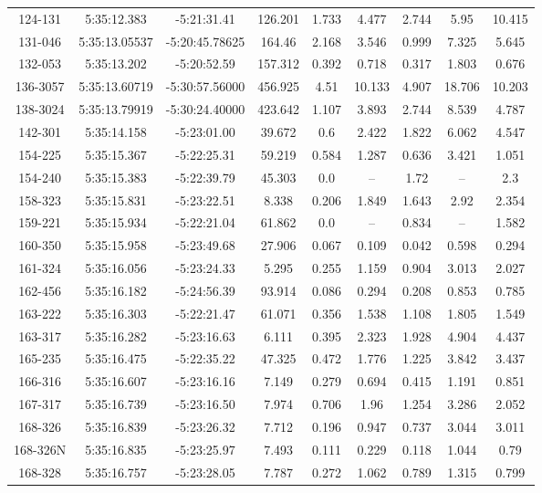 \begin{table}
\begin{tabular}{ccccccccc}
124-131 & 5:35:12.383 & -5:21:31.41 & 126.201 & 1.733 & 4.477 & 2.744 & 5.95 & 10.415 \\
131-046 & 5:35:13.05537 & -5:20:45.78625 & 164.46 & 2.168 & 3.546 & 0.999 & 7.325 & 5.645 \\
132-053 & 5:35:13.202 & -5:20:52.59 & 157.312 & 0.392 & 0.718 & 0.317 & 1.803 & 0.676 \\
136-3057 & 5:35:13.60719 & -5:30:57.56000 & 456.925 & 4.51 & 10.133 & 4.907 & 18.706 & 10.203 \\
138-3024 & 5:35:13.79919 & -5:30:24.40000 & 423.642 & 1.107 & 3.893 & 2.744 & 8.539 & 4.787 \\
142-301 & 5:35:14.158 & -5:23:01.00 & 39.672 & 0.6 & 2.422 & 1.822 & 6.062 & 4.547 \\
154-225 & 5:35:15.367 & -5:22:25.31 & 59.219 & 0.584 & 1.287 & 0.636 & 3.421 & 1.051 \\
154-240 & 5:35:15.383 & -5:22:39.79 & 45.303 & 0.0 & -- & 1.72 & -- & 2.3 \\
158-323 & 5:35:15.831 & -5:23:22.51 & 8.338 & 0.206 & 1.849 & 1.643 & 2.92 & 2.354 \\
159-221 & 5:35:15.934 & -5:22:21.04 & 61.862 & 0.0 & -- & 0.834 & -- & 1.582 \\
160-350 & 5:35:15.958 & -5:23:49.68 & 27.906 & 0.067 & 0.109 & 0.042 & 0.598 & 0.294 \\
161-324 & 5:35:16.056 & -5:23:24.33 & 5.295 & 0.255 & 1.159 & 0.904 & 3.013 & 2.027 \\
162-456 & 5:35:16.182 & -5:24:56.39 & 93.914 & 0.086 & 0.294 & 0.208 & 0.853 & 0.785 \\
163-222 & 5:35:16.303 & -5:22:21.47 & 61.071 & 0.356 & 1.538 & 1.108 & 1.805 & 1.549 \\
163-317 & 5:35:16.282 & -5:23:16.63 & 6.111 & 0.395 & 2.323 & 1.928 & 4.904 & 4.437 \\
165-235 & 5:35:16.475 & -5:22:35.22 & 47.325 & 0.472 & 1.776 & 1.225 & 3.842 & 3.437 \\
166-316 & 5:35:16.607 & -5:23:16.16 & 7.149 & 0.279 & 0.694 & 0.415 & 1.191 & 0.851 \\
167-317 & 5:35:16.739 & -5:23:16.50 & 7.974 & 0.706 & 1.96 & 1.254 & 3.286 & 2.052 \\
168-326 & 5:35:16.839 & -5:23:26.32 & 7.712 & 0.196 & 0.947 & 0.737 & 3.044 & 3.011 \\
168-326N & 5:35:16.835 & -5:23:25.97 & 7.493 & 0.111 & 0.229 & 0.118 & 1.044 & 0.79 \\
168-328 & 5:35:16.757 & -5:23:28.05 & 7.787 & 0.272 & 1.062 & 0.789 & 1.315 & 0.799 \\

\end{tabular}
\end{table}
